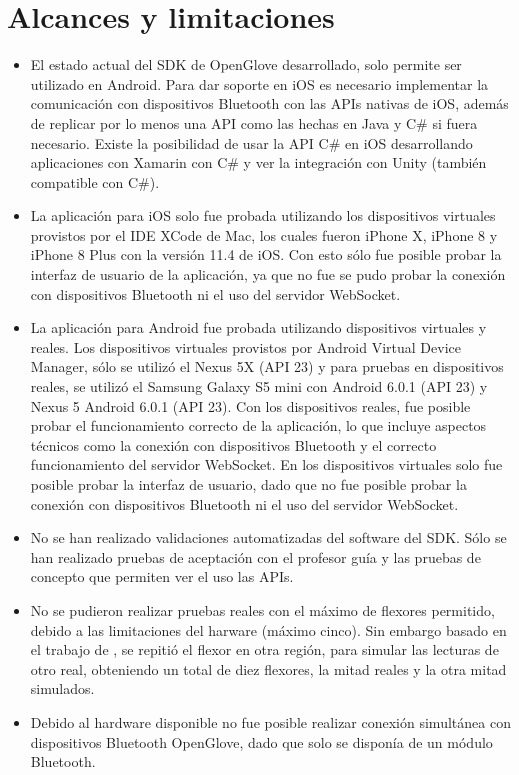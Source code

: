 \section{Alcances y limitaciones}

\begin{itemize}
	
	\item El estado actual del SDK de OpenGlove desarrollado, solo permite ser utilizado en Android. Para dar soporte en iOS es necesario implementar la comunicación con dispositivos Bluetooth con las APIs nativas de iOS, además de replicar por lo menos una API como las hechas en Java y C\# si fuera necesario. Existe la posibilidad de usar la API C\# en iOS desarrollando aplicaciones con Xamarin con C\# y ver la integración con Unity (también compatible con C\#).
	
	\item La aplicación para iOS solo fue probada utilizando los dispositivos virtuales provistos por el IDE XCode de Mac, los cuales fueron iPhone X, iPhone 8 y iPhone 8 Plus  con la versión 11.4 de iOS. Con esto sólo fue posible probar la interfaz de usuario de la aplicación, ya que no fue se pudo probar la conexión con dispositivos Bluetooth ni el uso del servidor WebSocket.
	
	\item La aplicación para Android fue probada utilizando dispositivos virtuales y reales. Los dispositivos virtuales provistos por Android Virtual Device Manager, sólo se utilizó el Nexus 5X (API 23) y para pruebas en dispositivos reales, se utilizó el Samsung Galaxy S5 mini con Android 6.0.1 (API 23) y Nexus 5 Android 6.0.1 (API 23). Con los dispositivos reales, fue posible probar el funcionamiento correcto de la aplicación, lo que incluye aspectos técnicos como la conexión con dispositivos Bluetooth y el correcto funcionamiento del servidor WebSocket. En los dispositivos virtuales solo fue posible probar la interfaz de usuario, dado que no fue posible probar la conexión con dispositivos Bluetooth ni el uso del servidor WebSocket.
	
	\item No se han realizado validaciones automatizadas del software del SDK. Sólo se han realizado pruebas de aceptación con el profesor guía y las pruebas de concepto que permiten ver el uso las APIs.
	
	\item No se pudieron realizar pruebas reales con el máximo de flexores permitido, debido a las limitaciones del harware (máximo cinco). Sin embargo basado en el trabajo de \cite{tesis-cerda-rodrigo}, se repitió el flexor en otra región, para simular las lecturas de otro real, obteniendo un total de diez flexores, la mitad reales y la otra mitad simulados.
	
	\item Debido al hardware disponible no fue posible realizar conexión simultánea con dispositivos Bluetooth OpenGlove, dado que solo se disponía de un módulo Bluetooth.
	
	
\end{itemize}